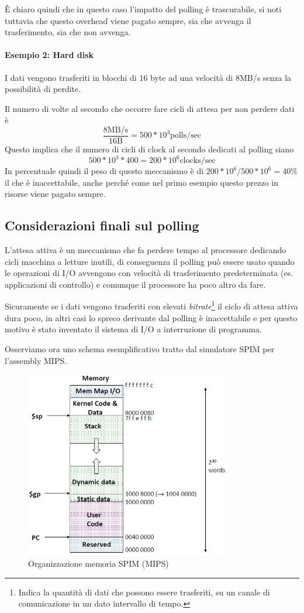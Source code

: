 \documentclass[class=book, crop=false, oneside]{standalone}
\begin{document}
È chiaro quindi che in questo caso l'impatto del polling è trascurabile, si noti tuttavia che questo overhead viene pagato sempre, sia che avvenga il trasferimento, sia che non avvenga.

\paragraph{Esempio 2: Hard disk} I dati vengono trasferiti in blocchi di 16 byte ad una velocità di 8MB/s senza la possibilità di perdite.

Il numero di volte al secondo che occorre fare cicli di attesa per non perdere dati è \[\frac{8\textrm{MB/s}}{16\textrm{B}} = 500*10^{3} \textrm{polls/sec}\]
Questo implica che il numero di cicli di clock al secondo dedicati al polling siano \[ 500*10^{3}*400 = 200*10^{6} \textrm{clocks/sec}\]
In percentuale quindi il peso di questo meccanismo è di \(200*10^{6}/500*10^{6}=40\%\) il che è inaccettabile, anche perché come nel primo esempio questo prezzo in risorse viene pagato sempre.

\subsection{Considerazioni finali sul polling}
L’attesa attiva è un meccanismo che fa perdere tempo al processore dedicando cicli macchina a letture inutili, di conseguenza il polling può essere usato quando le operazioni di I/O avvengono con velocità di trasferimento predeterminata (es. applicazioni di controllo) e comunque il processore ha poco altro da fare.

Sicuramente se i dati vengono trasferiti con elevati \emph{bitrate}\footnote{Indica la quantità di dati che possono essere trasferiti, su un canale di comunicazione in un dato intervallo di tempo.} il ciclo di attesa attiva dura poco, in altri casi lo spreco derivante dal polling è inaccettabile e per questo motivo è stato inventato il sistema di I/O a interruzione di programma.

Osserviamo ora uno schema esemplificativo tratto dal simulatore SPIM per l'assembly MIPS.
\begin{figure}[!h]
	\centering
	\includegraphics[width=0.8\textwidth,keepaspectratio]{SPIM}
	\caption{Organizzazione memoria SPIM (MIPS)}
\end{figure}
\end{document}
